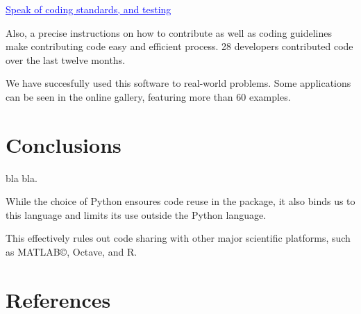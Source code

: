 \documentclass[twoside,11pt]{article}
\newcommand{\GAEL}[1]{\textcolor{blue}{\uline{#1}}}
\begin{document}
\GAEL{Speak of coding standards, and testing} 

Also, a precise instructions on how to contribute as well as coding
guidelines make contributing code easy and efficient process. 28
developers contributed code over the last twelve months.

We have succesfully used this software to real-world problems. Some
applications can be seen in the online gallery, featuring more than 60
examples.



\section{Conclusions}

bla bla.

While the choice of Python ensoures code reuse in the package, it also
binds us to this language and limits its use outside the Python
language.

This effectively rules out code sharing with other major scientific
platforms, such as MATLAB©, Octave, and R.



\section{References}
\end{document}
